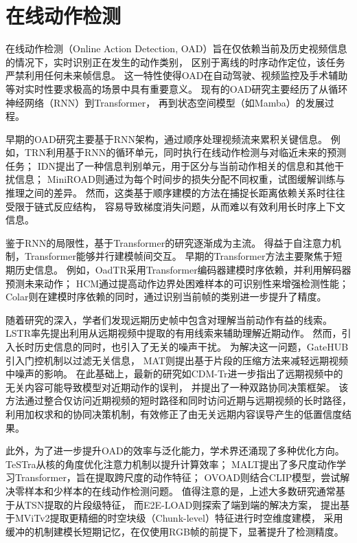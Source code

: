 \section{在线动作检测}
在线动作检测（Online Action Detection, OAD）旨在仅依赖当前及历史视频信息的情况下，实时识别正在发生的动作类别，
区别于离线的时序动作定位，该任务严禁利用任何未来帧信息。
这一特性使得OAD在自动驾驶、视频监控及手术辅助等对实时性要求极高的场景中具有重要意义。
现有的OAD研究主要经历了从循环神经网络（RNN）\cite{pascanu2013difficulty,lipton2015critical}到Transformer，
再到状态空间模型（如Mamba）的发展过程。

早期的OAD研究主要基于RNN架构，通过顺序处理视频流来累积关键信息。
例如，TRN\cite{xu2019temporal}利用基于RNN的循环单元，同时执行在线动作检测与对临近未来的预测任务；
IDN\cite{eun2020learning}提出了一种信息判别单元，用于区分与当前动作相关的信息和其他干扰信息；
MiniROAD\cite{an2023miniroad}则通过为每个时间步的损失分配不同权重，试图缓解训练与推理之间的差异。
然而，这类基于顺序建模的方法在捕捉长距离依赖关系时往往受限于链式反应结构，
容易导致梯度消失问题，从而难以有效利用长时序上下文信息。

鉴于RNN的局限性，基于Transformer的研究逐渐成为主流。
得益于自注意力机制，Transformer能够并行建模帧间交互。
早期的Transformer方法主要聚焦于短期历史信息。
例如，OadTR\cite{wang2021oadtr}采用Transformer编码器建模时序依赖，并利用解码器预测未来动作；
HCM\cite{liu2023hcm}通过提高动作边界处困难样本的可识别性来增强检测性能；
Colar\cite{yang2022colar}则在建模时序依赖的同时，通过识别当前帧的类别进一步提升了精度。

随着研究的深入，学者们发现远期历史帧中包含对理解当前动作有益的线索。
LSTR\cite{xu2021long}率先提出利用从远期视频中提取的有用线索来辅助理解近期动作。
然而，引入长时历史信息的同时，也引入了无关的噪声干扰。
为解决这一问题，GateHUB\cite{chen2022gatehub}引入门控机制以过滤无关信息，
MAT\cite{wang2023memory}则提出基于片段的压缩方法来减轻远期视频中噪声的影响。
在此基础上，最新的研究如CDM-Tr\cite{wang2025long}进一步指出了远期视频中的无关内容可能导致模型对近期动作的误判，
并提出了一种双路协同决策框架。
该方法通过整合仅访问近期视频的短时路径和同时访问近期与远期视频的长时路径，
利用加权求和的协同决策机制，有效修正了由无关远期内容误导产生的低置信度结果。

此外，为了进一步提升OAD的效率与泛化能力，学术界还涌现了多种优化方向。
TeSTra\cite{zhao2022real}从核的角度优化注意力机制以提升计算效率；
MALT\cite{yang2024malt}提出了多尺度动作学习Transformer，旨在提取跨尺度的动作特征；
OVOAD\cite{wang2024does}则结合CLIP模型，尝试解决零样本和少样本的在线动作检测问题。
值得注意的是，上述大多数研究通常基于从TSN\cite{wang2016temporal}提取的片段级特征，
而E2E-LOAD\cite{cao2023e2e}则探索了端到端的解决方案，
提出基于MViTv2\cite{li2022mvitv2}提取更精细的时空块级（Chunk-level）特征进行时空维度建模，
采用缓冲的机制建模长短期记忆，在仅使用RGB帧的前提下，显著提升了检测精度。

